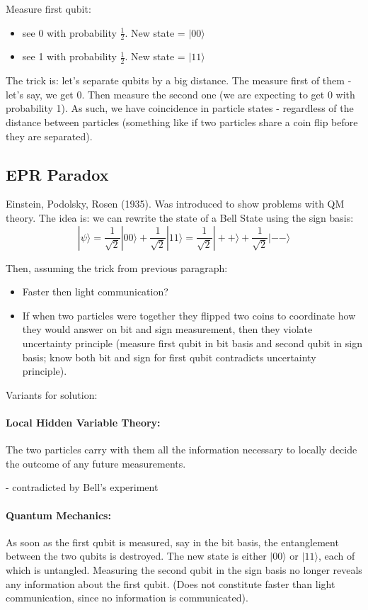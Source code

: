 \documentclass{scrartcl}
\begin{document}
Measure first qubit:
\begin{itemize}
\item see 0 with probability $\frac1{2}$. New state = $|00\rangle$
\item see 1 with probability $\frac1{2}$. New state = $|11\rangle$
\end{itemize}
The trick is: let's separate qubits by a big distance. The measure first of them
- let's say, we get 0. Then measure the second one (we are expecting to get 0
with probability 1). As such, we have coincidence in particle states -
regardless of the distance between particles (something like if two particles
share a coin flip before they are separated).

\subsection{EPR Paradox}
\label{sec:3-4}

Einstein, Podolsky, Rosen (1935). Was introduced to show problems with QM
theory. The idea is: we can rewrite the state of a Bell State using the sign
basis:
$$|\psi\rangle = \frac1{\sqrt{2}} |00\rangle + \frac1{\sqrt{2}}|11\rangle =
\frac1{\sqrt{2}} |++\rangle + \frac1{\sqrt{2}}|--\rangle $$

Then, assuming the trick from previous paragraph:
\begin{itemize}
\item Faster then light communication?
\item If when two particles were together they flipped two coins to coordinate
  how they would answer on bit and sign measurement, then they violate
  uncertainty principle (measure first qubit in bit basis and second qubit in
  sign basis; know both bit and sign for first qubit contradicts uncertainty
  principle).
\end{itemize}
Variants for solution:
\paragraph{Local Hidden Variable Theory:} The two particles carry with them all
the information necessary to locally decide the outcome of any future
measurements.

- contradicted by Bell's experiment

\paragraph{Quantum Mechanics:} As soon as the first qubit is measured, say in
the bit basis, the entanglement between the two qubits is destroyed. The new
state is either $|00\rangle$ or $|11\rangle$, each of which is untangled.
Measuring the second qubit in the sign basis no longer reveals any information
about the first qubit. (Does not constitute faster than light communication,
since no information is communicated).
\end{document}
